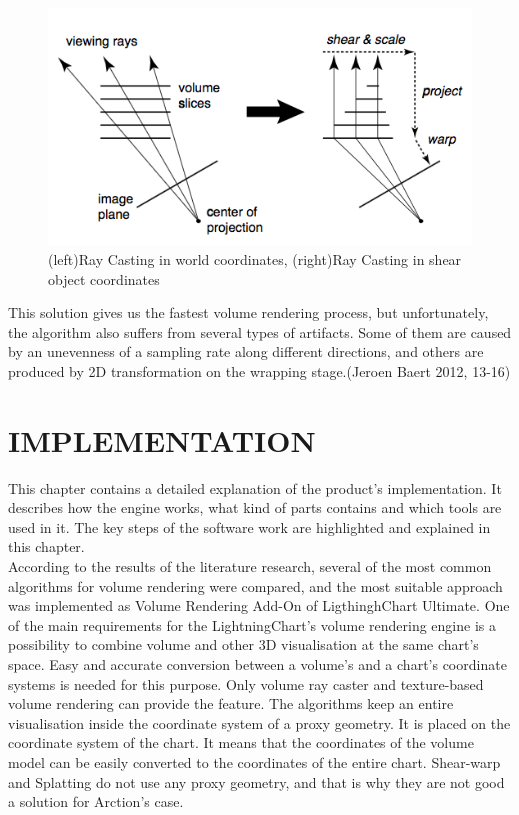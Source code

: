 \documentclass[twoside, english, 11pt]{report}
\begin{document}
\begin{figure}[!h]
\centerline{\includegraphics[scale=0.5]{img/shear-warp}}
\caption{(left)Ray Casting in world coordinates, (right)Ray Casting in shear object coordinates\label{fig:sw}}
\end{figure}

This solution gives us the fastest volume rendering process, but unfortunately, the algorithm also suffers from several types of artifacts. Some of them are caused by an unevenness of a sampling rate along different directions, and others are produced by 2D transformation on the wrapping stage.(Jeroen Baert 2012, 13-16)\\

\chapter{IMPLEMENTATION}
This chapter contains a detailed explanation of the product's implementation. It describes how the engine works, what kind of parts contains and which tools are used in it. The key steps of the software work are highlighted and explained in this chapter.\\

According to the results of the literature research, several of the most common algorithms for volume rendering were compared, and the most suitable approach was implemented as Volume Rendering Add-On of LigthinghChart Ultimate. One of the main requirements for the LightningChart's volume rendering engine is a possibility to combine volume and other 3D visualisation at the same chart's space. Easy and accurate conversion between a volume's and a chart's coordinate systems is needed for this purpose. Only volume ray caster and texture-based volume rendering can provide the feature. The algorithms keep an entire visualisation inside the coordinate system of a proxy geometry. It is placed on the coordinate system of the chart. It means that the coordinates of the volume model can be easily converted to the coordinates of the entire chart. Shear-warp and Splatting do not use any proxy geometry, and that is why they are not good a solution for Arction's case.\\
\end{document}
